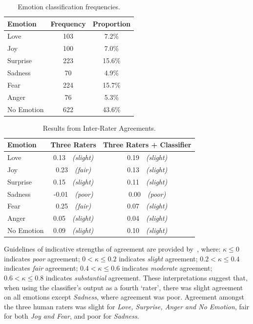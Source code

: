 \begin{table}
    \caption[Emotion classification frequencies]{Emotion classification frequencies.}
    \centering
    \label{caise2021:tab:emotion-freqs}
    \small
    \begin{tabular}{l|cc}
    \toprule
    \textbf{Emotion}&
    \textbf{Frequency}&
    \textbf{Proportion}\\
    \midrule
   Love&103&7.2\%\\
   Joy&100&7.0\%\\
   Surprise&223&15.6\%\\
   Sadness&70&4.9\%\\
   Fear&224&15.7\%\\
   Anger&76&5.3\%\\
   No Emotion&622&43.6\%\\
    \bottomrule
    \end{tabular}
    \end{table}
   \begin{table}
   \caption[Reliability Analysis of Emotion Classification]{Results from Inter-Rater Agreements.}
   \centering
   \label{caise2021:tab:reliability-analysis}
   \small
   \begin{tabular}{l|cc}
   \toprule
   \textbf{Emotion}&
   \textbf{Three Raters}&
   \textbf{Three Raters + Classifier}\\
   \midrule
   Love&0.13~~\textit{(slight)}&0.19~~\textit{(slight)}\\
   Joy&0.23~~\textit{(fair)}&0.13~~\textit{(slight)}\\
   Surprise&0.15~~\textit{(slight)} &0.11~~\textit{(slight)}\\
   Sadness&-0.01~~\textit{(poor)}&0.00~~\textit{(poor)}\\
   Fear&0.25~~\textit{(fair)}&0.07~~\textit{(slight)}\\
   Anger&0.05~~\textit{(slight)}&0.04~~\textit{(slight)}\\
   No Emotion&0.09~~\textit{(slight)}&0.10~~\textit{(slight)}\\
   \bottomrule
   \end{tabular}
   \end{table}

Guidelines of indicative strengths of agreement are provided by~\citet{Landis:1977kv}, where: $\kappa \leq 0$ indicates \textit{poor} agreement; $0 < \kappa \leq 0.2$ indicates \textit{slight} agreement; $0.2 < \kappa \leq 0.4$ indicates \textit{fair} agreement; $0.4 < \kappa \leq 0.6$ indicates \textit{moderate} agreement; $0.6 < \kappa \leq 0.8$ indicates \textit{substantial} agreement. These interpretations suggest that, when using the classifier's output as a fourth `rater', there was slight agreement on all emotions except \textit{Sadness}, where agreement was poor.  Agreement amongst the three human raters was slight for \textit{Love, Surprise, Anger and No Emotion}, fair for both \textit{Joy and Fear}, and poor for \textit{Sadness}. 

